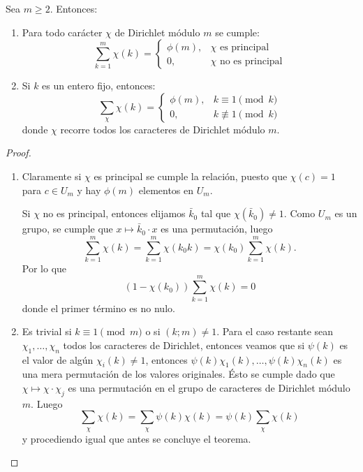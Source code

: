 \documentclass[teoria-numeros.tex]{subfiles}
\begin{document}
\begin{thm}\label{thm:chi_sums}
	Sea $m\ge 2$. Entonces:
	\begin{enumerate}
		\item Para todo carácter $\chi$ de Dirichlet módulo $m$ se cumple:
			$$ \sum_{k=1}^m \chi(k) =
			\begin{cases}
				\phi(m), & \text{$\chi$ es principal} \\
				0,       & \text{$\chi$ no es principal}
			\end{cases} $$

		\item Si $k$ es un entero fijo, entonces:
			$$ \sum_{\chi} \chi(k) =
			\begin{cases}
				\phi(m), & k \equiv 1\pmod k \\
				0,       & k\not\equiv 1\pmod k
			\end{cases} $$
			donde $\chi$ recorre todos los caracteres de Dirichlet módulo $m$.
	\end{enumerate}
\end{thm}
\begin{proof}
	\begin{enumerate}
		\item Claramente si $\chi$ es principal se cumple la relación, puesto que $\chi(c) = 1$ para $c \in U_m$ y hay $\phi(m)$ elementos en $U_m$.

			Si $\chi$ no es principal, entonces elijamos $\bar k_0$ tal que $\chi(\bar k_0) \ne 1$. Como $U_m$ es un grupo, se cumple que
			$x \mapsto \bar k_0 \cdot x$ es una permutación, luego
			$$ \sum_{k=1}^m \chi(k) = \sum_{k=1}^m \chi(k_0k) = \chi(k_0)\sum_{k=1}^m \chi(k). $$
			Por lo que
			$$ (1 - \chi(k_0)) \sum_{k=1}^m \chi(k) = 0 $$
			donde el primer término es no nulo.

		\item Es trivial si $k \equiv 1 \pmod m$ o si $(k; m) \ne 1$.
			Para el caso restante sean $\chi_1, \dots, \chi_n$ todos los caracteres de Dirichlet, entonces veamos que
			si $\psi(k)$ es el valor de algún $\chi_i(k) \ne 1$, entonces $\psi(k)\chi_1(k), \dots, \psi(k)\chi_n(k)$
			es una mera permutación de los valores originales.
			Ésto se cumple dado que $\chi \mapsto \chi\cdot\chi_j$ es una permutación en el grupo de caracteres de Dirichlet módulo $m$.
			Luego
			$$ \sum_\chi \chi(k) = \sum_\chi \psi(k)\chi(k) = \psi(k)\sum_\chi \chi(k) $$
			y procediendo igual que antes se concluye el teorema. \qedhere
	\end{enumerate}
\end{proof}
\end{document}
